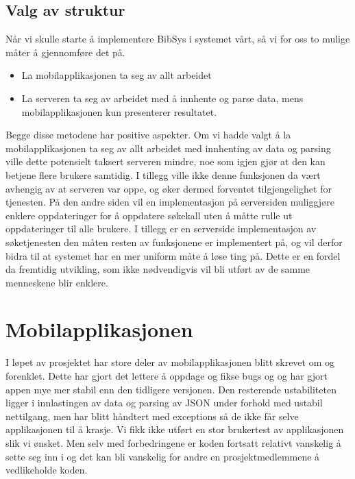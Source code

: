 \documentclass[../main.tex]{subfiles}
\begin{document}
\subsection{Valg av struktur}

Når vi skulle starte å implementere BibSys i systemet vårt, så vi for oss to mulige måter å gjennomføre det på.
\begin{itemize}
\item La mobilapplikasjonen ta seg av allt arbeidet
\item La serveren ta seg av arbeidet med å innhente og parse data, mens mobilapplikasjonen kun presenterer resultatet.
\end{itemize}
Begge disse metodene har positive aspekter. Om vi hadde valgt å la mobilapplikasjonen ta seg av allt arbeidet med innhenting av data og parsing ville dette potensielt taksert serveren mindre, noe som igjen gjør at den kan betjene flere brukere samtidig. I tillegg ville ikke denne funksjonen da vært avhengig av at serveren var oppe, og øker dermed forventet tilgjengelighet for tjenesten.
På den andre siden vil en implementasjon på serversiden muliggjøre enklere oppdateringer for å oppdatere søkekall uten å måtte rulle ut oppdateringer til alle brukere. I tillegg er en serverside implementasjon av søketjenesten den måten resten av funksjonene er implementert på, og vil derfor bidra til at systemet har en mer uniform måte å løse ting på. Dette er en fordel da fremtidig utvikling, som ikke nødvendigvis vil bli utført av de samme menneskene blir enklere.

\section{Mobilapplikasjonen}
I løpet av prosjektet har store deler av mobilapplikasjonen blitt skrevet om og forenklet. Dette har gjort det lettere å oppdage og fikse bugs og og har gjort appen mye mer stabil enn den tidligere versjonen. Den resterende ustabiliteten ligger i innlastingen av data og parsing av JSON under forhold med ustabil nettilgang, men har blitt håndtert med exceptions så de ikke får selve applikasjonen til å krasje. Vi fikk ikke utført en stor brukertest av applikasjonen slik vi ønsket. Men selv med forbedringene er koden fortsatt relativt vanskelig å sette seg inn i og det kan bli vanskelig for andre en prosjektmedlemmene å vedlikeholde koden.
\end{document}
